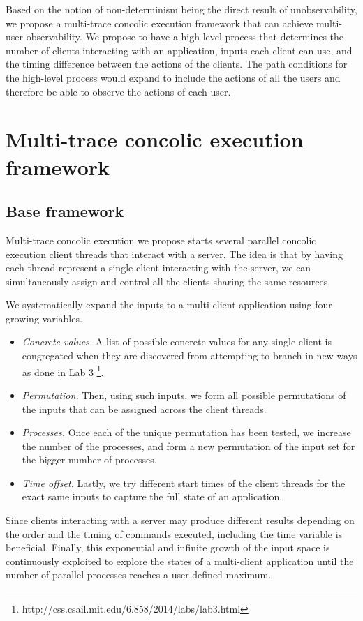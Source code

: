 \documentclass{llncs}
\begin{document}
Based on the notion of non-determinism being the direct result of
unobservability, we propose a multi-trace concolic execution framework
that can achieve multi-user observability. We propose to have a
high-level process that determines the number of clients interacting
with an application, inputs each client can use, and the timing
difference between the actions of the clients. The path conditions for
the high-level process would expand to include the actions of all the
users and therefore be able to observe the actions of each user.

\section{Multi-trace concolic execution framework}

\subsection{Base framework}

Multi-trace concolic execution we propose starts several parallel
concolic execution client threads that interact with a server. The
idea is that by having each thread represent a single client
interacting with the server, we can simultaneously assign and control
all the clients sharing the same resources.

We systematically expand the inputs to a multi-client application
using four growing variables.
\begin{itemize}
\item \textit{Concrete values.} A list of possible concrete values
  for any single client is congregated when they are discovered from
  attempting to branch in new ways as done in Lab
  3 \footnote{http://css.csail.mit.edu/6.858/2014/labs/lab3.html}.
\item \textit{Permutation.} Then, using such inputs, we form all
  possible permutations of the inputs that can be assigned across the
  client threads.
\item \textit{Processes.} Once each of the unique permutation has been
  tested, we increase the number of the processes, and form a new
  permutation of the input set for the bigger number of processes.
\item \textit{Time offset.} Lastly, we try different start times of the
  client threads for the exact same inputs to capture the full state
  of an application.
\end{itemize}

Since clients interacting with a server may produce different results
depending on the order and the timing of commands executed, including
the time variable is beneficial. Finally, this exponential and
infinite growth of the input space is continuously exploited to
explore the states of a multi-client application until the number of
parallel processes reaches a user-defined maximum.
\end{document}
